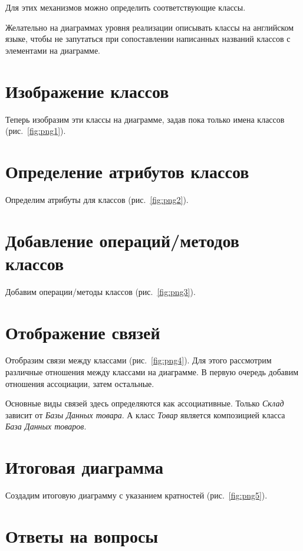 Для этих механизмов можно определить соответствующие классы.\par
Желательно на диаграммах уровня реализации описывать классы на
английском языке, чтобы не запутаться при сопоставлении написанных
названий классов с элементами на диаграмме.

\section{Изображение классов}
Теперь изобразим эти классы на диаграмме, задав пока только
имена классов (рис.~\ref{fig:png1}).


\section{Определение атрибутов классов}
Определим атрибуты для классов (рис.~\ref{fig:png2}).


\section{Добавление операций/методов классов}
Добавим операции/методы классов (рис.~\ref{fig:png3}).

\section{Отображение связей}
Отобразим связи между классами (рис.~\ref{fig:png4}).
Для этого рассмотрим различные отношения между классами на диаграмме.
В первую очередь добавим отношения ассоциации, затем остальные.


Основные виды связей здесь определяются как ассоциативные. Только
\textit{Склад} зависит от \textit{Базы Данных товара}.
А класс \textit{Товар} является композицией класса
\textit{База Данных товаров}.

\section{Итоговая диаграмма}
Создадим итоговую диаграмму с указанием кратностей
(рис.~\ref{fig:png5}).

\clearpage

\section*{Ответы на вопросы}

